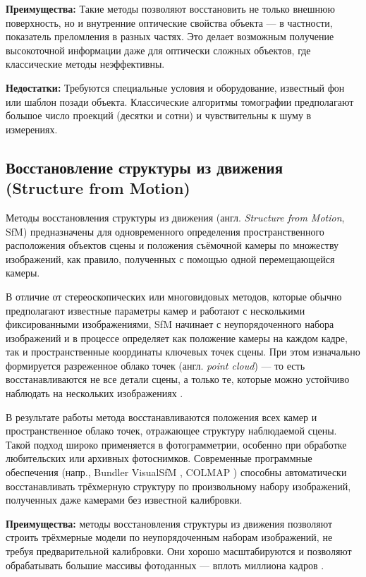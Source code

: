 \textbf{Преимущества:} Такие методы позволяют восстановить не только внешнюю
поверхность, но и внутренние оптические свойства объекта — в частности,
показатель преломления в разных частях. Это делает возможным получение
высокоточной информации даже для оптически сложных объектов, где классические методы
неэффективны.

\textbf{Недостатки:} Требуются специальные условия и оборудование,
известный фон или шаблон позади объекта. Классические алгоритмы томографии
предполагают большое число проекций (десятки и сотни) и чувствительны
к шуму в измерениях.

\subsection{Восстановление структуры из движения (Structure from Motion)}

Методы восстановления структуры из движения (англ. \emph{Structure from Motion},
 SfM) предназначены для одновременного определения пространственного
расположения объектов сцены и положения съёмочной камеры по множеству
изображений, как правило, полученных с помощью одной перемещающейся камеры.

В отличие от стереоскопических или многовидовых методов, которые обычно
предполагают известные параметры камер и работают с несколькими фиксированными
изображениями, SfM начинает с неупорядоченного
набора изображений и в процессе определяет как положение камеры на каждом кадре,
так и пространственные координаты ключевых точек сцены. При этом изначально
формируется разреженное облако точек (англ. \emph{point cloud}) — то есть восстанавливаются не все детали
сцены, а только те, которые можно устойчиво наблюдать на нескольких
изображениях \cite{10.1109/CVPR.2016.4454}.

В результате работы метода восстанавливаются положения всех камер и
пространственное облако точек, отражающее структуру наблюдаемой сцены. Такой
подход широко применяется в фотограмметрии, особенно при обработке любительских
или архивных фотоснимков. Современные программные обеспечения (напр., Bundler
\cite{10.1145/3596711.3596766} VisualSfM \cite{10.1109/3DV.2013.25}, COLMAP \cite{schoenberger2016mvs})
способны автоматически восстанавливать трёхмерную структуру по произвольному
набору изображений, полученных даже камерами без известной калибровки.

\textbf{Преимущества:} методы восстановления структуры из движения позволяют
строить трёхмерные модели по неупорядоченным наборам изображений, не требуя
предварительной калибровки. Они хорошо масштабируются и позволяют обрабатывать
большие массивы фотоданных — вплоть миллиона кадров \cite{10.1109/CVPR.2015.7298949}.

